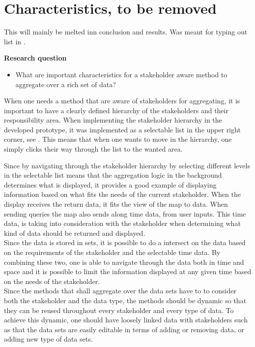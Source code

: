 
\section{Characteristics, to be removed} %
\label{sec:characteristics}
This will mainly be melted inn conclusion and results. Was meant for typing out
list in .

\textbf{Research question}
\begin{itemize}
	\item What are important characteristics for a stakeholder aware method to 
	aggregate over a rich set of data?
\end{itemize}

When one needs a method that are aware of stakeholders for aggregating, it is
important to have a clearly defined hierarchy of the stakeholders and their 
responsibility area. When implementing the stakeholder hierarchy in the
developed prototype, it was implemented as a selectable list in the upper right
corner, see . This means that when 
one wants to move in the hierarchy, one simply clicks their way through the 
list to the wanted area.


Since by navigating through the stakeholder hierarchy by selecting different
levels in the selectable list means that the aggregation logic in the 
background determines what is displayed, it provides a good example of
displaying information based on what fits the needs of the current stakeholder.
When the display receives the return data, it fits the view of the map to
data. When sending queries the map also sends along time data, from user 
inputs. This time data, is taking into consideration with the stakeholder when 
determining what kind of data should be returned and displayed.\\

Since the data is stored in sets, it is possible to do a intersect on the data
based on the requirements of the stakeholder and the selectable time data.
By combining these two, one is able to navigate through the  data both in time 
and space and it is possible to limit the information displayed at any given
time based on the needs of the stakeholder.\\


Since the methods that shall aggregate over the data sets have to to consider
both the stakeholder and the data type, the methods should be dynamic so that
they can be reused throughout every stakeholder and every type of data. To 
achieve this dynamic, one should have loosely linked data with stakeholders
such as that the data sets are easily editable in terms of adding or removing
data, or adding new type of data sets.

